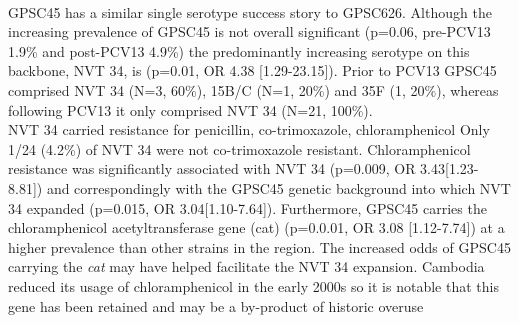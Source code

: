 \documentclass{article}
\begin{document}
\\GPSC45 has a similar single serotype success story to GPSC626. Although the increasing prevalence of GPSC45 is not overall significant (p=0.06, pre-PCV13 1.9\% and post-PCV13 4.9\%) the predominantly increasing serotype on this backbone, NVT 34, is (p=0.01, OR 4.38 [1.29-23.15]). Prior to PCV13 GPSC45 comprised NVT 34 (N=3, 60\%), 15B/C (N=1, 20\%) and 35F (1, 20\%), whereas following PCV13 it only comprised NVT 34 (N=21, 100\%).
\\NVT 34 carried resistance for penicillin, co-trimoxazole, chloramphenicol Only 1/24 (4.2\%) of NVT 34 were not co-trimoxazole resistant. Chloramphenicol resistance was significantly associated with NVT 34 (p=0.009, OR 3.43[1.23-8.81]) and correspondingly with the GPSC45 genetic background into which NVT 34 expanded (p=0.015, OR 3.04[1.10-7.64]). Furthermore, GPSC45 carries the chloramphenicol acetyltransferase gene (cat) (p=0.0.01, OR 3.08 [1.12-7.74]) at a higher prevalence than other strains in the region. The increased odds of GPSC45 carrying the \textit{cat} may have helped facilitate the NVT 34 expansion. Cambodia reduced its usage of chloramphenicol in the early 2000s so it is notable that this gene has been retained and may be a by-product of historic overuse\cite{ fox-lewisAntimicrobialResistanceInvasive2018}
\end{document}
